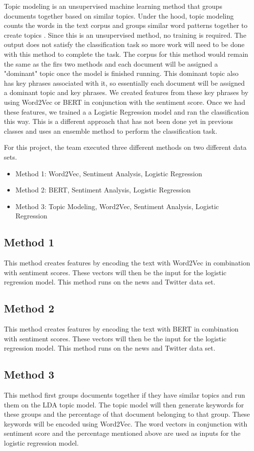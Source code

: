 \documentclass[conference]{IEEEtran}
\begin{document}
Topic modeling is an unsupervised machine learning method that groups documents together based on similar topics. Under the hood, topic modeling counts the words in the text corpus and groups similar word patterns together to create topics \cite{b5}. Since this is an unsupervised method, no training is required. The output does not satisfy the classification task so more work will need to be done with this method to complete the task. The corpus for this method would remain the same as the firs two methods and each document will be assigned a "dominant" topic once the model is finished running. This dominant topic also has key phrases associated with it, so essentially each document will be assigned a dominant topic and key phrases. We created features from these key phrases by using Word2Vec or BERT in conjunction with the sentiment score. Once we had these features, we trained a a Logistic Regression model and ran the classification this way. This is a different approach that has not been done yet in previous classes and uses an ensemble method to perform the classification task.

For this project, the team executed three different methods on two different data sets.
\begin{itemize}
    \item Method 1: Word2Vec, Sentiment Analysis, Logistic Regression
    \item Method 2: BERT, Sentiment Analysis, Logistic Regression
    \item Method 3: Topic Modeling, Word2Vec, Sentiment Analysis, Logistic Regression
\end{itemize}
\subsection{Method 1}
This method creates features by encoding the text with Word2Vec in combination with sentiment scores. These vectors will then be the input for the logistic regression model. This method runs on the news and Twitter data set.
\subsection{Method 2}
This method creates features by encoding the text with BERT in combination with sentiment scores. These vectors will then be the input for the logistic regression model. This method runs on the news and Twitter data set.
\subsection{Method 3}
This method first groups documents together if they have similar topics and run them on the LDA topic model. The topic model will then generate keywords for these groups and the percentage of that document belonging to that group. These keywords will be encoded using Word2Vec. The word vectors in conjunction with sentiment score and the percentage mentioned above are used as inputs for the logistic regression model.
\end{document}
